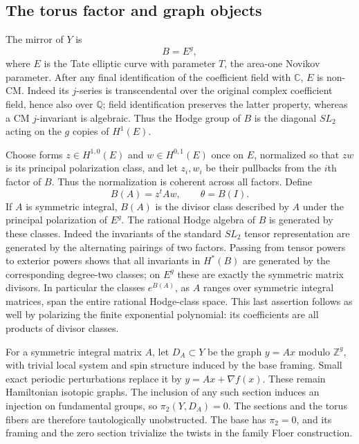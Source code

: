 \documentclass[11pt]{article}
\numberwithin{equation}{section}
\theoremstyle{definition}
\theoremstyle{remark}
\newcommand{\Q}{\mathbb Q}
\newcommand{\C}{\mathbb C}
\newcommand{\Z}{\mathbb Z}
\begin{document}
\subsection{The torus factor and graph objects}

The mirror of $Y$ is
\[
 B=E^g,
\]
where $E$ is the Tate elliptic curve with parameter $T$, the area-one
Novikov parameter.  After any final identification of the coefficient field
with $\C$, $E$ is non-CM.  Indeed its $j$-series is transcendental over the
original complex coefficient field, hence also over $\Q$; field
identification preserves the latter property, whereas a CM $j$-invariant
is algebraic.  Thus the Hodge group of $B$ is the diagonal $SL_2$ acting
on the $g$ copies of $H^1(E)$.

Choose forms $z\in H^{1,0}(E)$ and $w\in H^{0,1}(E)$ once on $E$,
normalized so that $zw$ is its principal polarization class, and
let $z_i,w_i$ be their pullbacks from the $i$th factor of $B$.
Thus the normalization is coherent across all factors.  Define
\begin{equation}\label{eq:matrix-divisors}
 B(A)=z^tAw,\qquad \theta=B(I).
\end{equation}
If $A$ is symmetric integral, $B(A)$ is the divisor class described by
$A$ under the principal polarization of $E^g$.  The rational Hodge algebra
of $B$ is generated by these classes.  Indeed the invariants of the
standard $SL_2$ tensor representation are generated by the alternating
pairings of two factors.  Passing from tensor powers to exterior powers
shows that all invariants in $H^*(B)$ are generated by the corresponding
degree-two classes; on $E^g$ these are exactly the symmetric matrix
divisors.  In particular the classes $e^{B(A)}$, as $A$ ranges over
symmetric integral matrices, span the entire rational Hodge-class space.
This last assertion follows as well by polarizing the finite exponential
polynomial: its coefficients are all products of divisor classes.

For a symmetric integral matrix $A$, let $D_A\subset Y$ be the graph
$y=Ax$ modulo $\Z^g$, with trivial local system and spin structure induced
by the base framing.  Small exact periodic perturbations replace it by
$y=Ax+\nabla f(x)$.  These remain Hamiltonian isotopic graphs.  The inclusion
of any such section induces an injection on fundamental groups, so
$\pi_2(Y,D_A)=0$.  The sections and the torus fibers are therefore
tautologically unobstructed.  The base has $\pi_2=0$, and its framing and
the zero section trivialize the twists in the family Floer construction.
\end{document}

